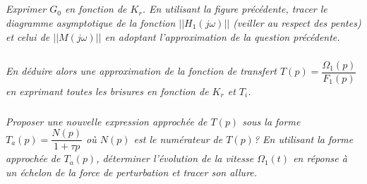 \documentclass[10pt,fleqn]{article} %
\begin{document}
\begin{multicols}{2}
\subparagraph{}\textit{Exprimer $G_0$ en fonction de $K_r$. En utilisant la figure précédente, tracer le diagramme asymptotique de la fonction $\left|\left|H_1\left(j \omega\right)\right|\right|$ (veiller
au respect des pentes) et celui de $\left|\left|M\left(j \omega\right)\right|\right|$ en adoptant l’approximation de la
question précédente.}

\subparagraph{}\textit{En déduire alors une approximation de la fonction de transfert
$T(p)=\dfrac{\Omega_1(p)}{F_1(p)}$ en exprimant toutes les brisures en fonction de $K_r$ et $T_i$.}

\subparagraph{}\textit{Proposer une nouvelle expression approchée de $T(p)$ sous la forme $T_a(p)=\dfrac{N(p)}{1+\tau p}$ où $N(p)$ est le numérateur de $T(p)$? En utilisant la forme approchée de $T_a(p)$, déterminer l'évolution de la vitesse $\Omega_1(t)$ en réponse à un échelon de la force de perturbation et tracer son allure. }

\subparagraph{}\textit{}

\subparagraph{}\textit{}

\subparagraph{}\textit{}

\subparagraph{}\textit{}

\end{multicols}

%
\end{document}
